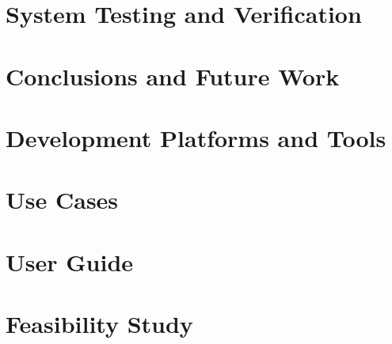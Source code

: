 \documentclass[a4paper,12pt]{article}
\begin{document}
\newpage

\section{System Testing and Verification}


\newpage

\section{Conclusions and Future Work}


\newpage


\medskip




\newpage


\appendix

\section{Development Platforms and Tools}


\section{Use Cases}


\section{User Guide}


\section{Feasibility Study}


\end{document}
